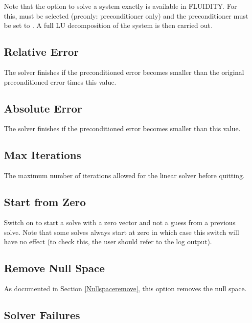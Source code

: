 Note that the option to solve a system exactly is available in FLUIDITY. For this,  must be selected (preonly: preconditioner only) and the preconditioner must be set to . A full LU decomposition of the system is then carried out.

\subsection{Relative Error}

The solver finishes if the preconditioned error becomes smaller than the original preconditioned error times this value.

\subsection{Absolute Error}

The solver finishes if the preconditioned error becomes smaller than this value.

\subsection{Max Iterations}

The maximum number of iterations allowed for the linear solver before quitting.

\subsection{Start from Zero}

Switch on to start a solve with a zero vector and not a guess from a previous solve. Note that some solves always start at zero in which case this switch will have no effect (to check this, the user should refer to the log output).

\subsection{Remove Null Space}

As documented in Section \ref{Nullspaceremove}, this option removes the null space.

\subsection{Solver Failures}

